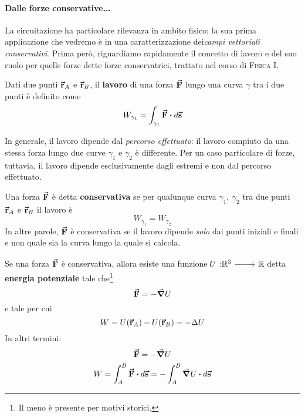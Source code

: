 \paragraph{Dalle forze conservative...}
La circuitazione ha particolare rilevanza in ambito fisico; la sua prima applicazione che vedremo è in una caratterizzazione dei\textit{campi vettoriali conservativi}. Prima però, riguardiamo rapidamente il concetto di lavoro e del suo ruolo per quelle forze dette forze conservatrici, trattato nel corso di \textsc{Fisica I}.
\begin{define}[Lavoro]
	Dati due punti $\vb*{\va{r}}_A$ e $\vb*{\va{r}}_B$, il \textbf{lavoro} di una forza $\vb*{\va{F}}$ lungo una curva $\gamma$ tra i due punti è definito come
	\begin{equation}
		W_{\gamma_1}=\int_{\gamma_1}\vba{F}\vdot d\vba{s}
	\end{equation}
\end{define}
In generale, il lavoro dipende dal \textit{percorso effettuato}: il lavoro compiuto da una stessa forza lungo due curve $\gamma_1$ e $\gamma_2$  è differente. Per un caso particolare di forze, tuttavia, il lavoro dipende esclusivamente dagli estremi e non dal percorso effettuato.
\begin{define}
	Una forza $\vb*{\va{F}}$ è detta \textbf{conservativa} se per qualunque curva $\gamma_1,\ \gamma_2$ tra due punti $\vb*{\va{r}}_A$ e $\vb*{\va{r}}_B$ il lavoro è
	\begin{equation}
		W_{\gamma_1}=W_{\gamma_2}
	\end{equation}
	In altre parole, $\vb*{\va{F}}$ è conservativa se il lavoro dipende \textit{solo} dai punti iniziali e finali e non quale sia la curva lungo la quale si calcola.
\end{define}
\begin{proposition}\label{forzaconservativaproposizione} %
	Se una forza $\vb*{\va{F}}$ è conservativa, allora esiste una funzione $\funz[U]{\realset^3}{\realset}$ detta \textbf{energia potenziale} tale che\footnote{Il meno è presente per motivi storici.}
	\begin{equation}
		\vb*{\va{F}}=-\grad{U}
	\end{equation}
	e tale per cui
	\begin{equation}
		W=U(\vb*{\va{r}}_A)-U(\vb*{\va{r}}_B)=-\Delta U
	\end{equation}
	In altri termini:
	\begin{gather}
		\vba{F}=-\grad{U}\\
		W=\int_A^{B}\vba{F}\vdot d\vba{s}=-\int_A^B\grad{U}\vdot d\vba{s}
	\end{gather}
\end{proposition}
